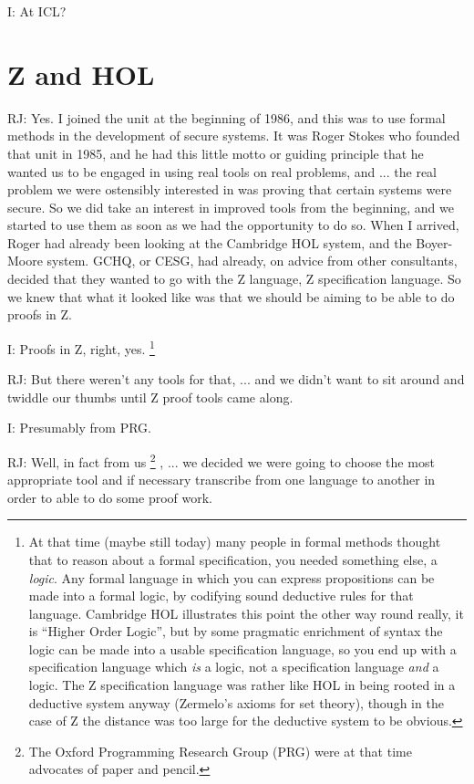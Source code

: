 \documentclass[10pt,titlepage]{book}
\begin{document}
I: At ICL?

\section{Z and HOL}

RJ: Yes.
I joined the unit at the beginning of 1986, and this was to use formal methods in the development of secure systems.
It was Roger Stokes who founded that unit in 1985, and he had this little motto or guiding principle that he wanted us to be engaged in using real tools on real problems, and ... the real problem we were ostensibly interested in was proving that certain systems were secure.
So we did take an interest in improved tools from the beginning, and we started to use them as soon as we had the opportunity to do so.
When I arrived, Roger had already been looking at the Cambridge HOL system, and the Boyer-Moore system.
GCHQ, or CESG, had already, on advice from other consultants, decided that they wanted to go with the Z language, Z specification language.
So we knew that what it looked like was that we should be aiming to be able to do proofs in Z.

I: Proofs in Z, right, yes.
\footnote{
At that time (maybe still today) many people in formal methods thought that to reason about a formal specification, you needed something else, a {\it logic}.
Any formal language in which you can express propositions can be made into a formal logic, by codifying sound deductive rules for that language.
Cambridge HOL illustrates this point the other way round really, it is ``Higher Order Logic'', but by some pragmatic enrichment of syntax the logic can be made into a usable specification language, so you end up with a specification language which {\it is} a logic, not a specification language {\it and} a logic.
The Z specification language was rather like HOL in being rooted in a deductive system anyway (Zermelo's axioms for set theory), though in the case of Z the distance was too large for the deductive system to be obvious.
}

RJ: But there weren't any tools for that, ... and we didn't want to sit around and twiddle our thumbs until Z proof tools came along.

I: Presumably from PRG.

RJ: Well, in fact from us%
\footnote{The Oxford Programming Research Group (PRG) were at that time advocates of paper and pencil.}%
, ... we decided we were going to choose the most appropriate tool and if necessary transcribe from one language to another in order to able to do some proof work.
\end{document}
